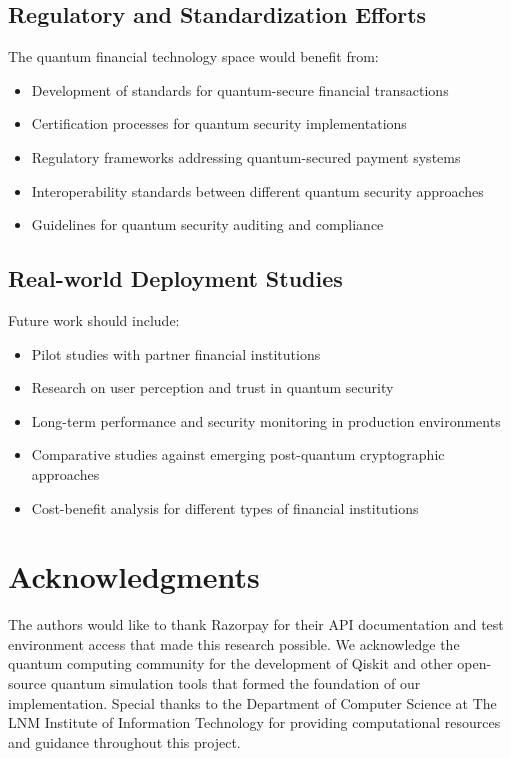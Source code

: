 \documentclass[onecolumn,a4paper,10pt]{IEEEtran}
\begin{document}
\subsection{Regulatory and Standardization Efforts}
The quantum financial technology space would benefit from:
\begin{itemize}
    \item Development of standards for quantum-secure financial transactions
    \item Certification processes for quantum security implementations
    \item Regulatory frameworks addressing quantum-secured payment systems
    \item Interoperability standards between different quantum security approaches
    \item Guidelines for quantum security auditing and compliance
\end{itemize}

\subsection{Real-world Deployment Studies}
Future work should include:
\begin{itemize}
    \item Pilot studies with partner financial institutions
    \item Research on user perception and trust in quantum security
    \item Long-term performance and security monitoring in production environments
    \item Comparative studies against emerging post-quantum cryptographic approaches
    \item Cost-benefit analysis for different types of financial institutions
\end{itemize}

\section{Acknowledgments}
The authors would like to thank Razorpay for their API documentation and test environment access that made this research possible. We acknowledge the quantum computing community for the development of Qiskit and other open-source quantum simulation tools that formed the foundation of our implementation. Special thanks to the Department of Computer Science at The LNM Institute of Information Technology for providing computational resources and guidance throughout this project.
\end{document}
